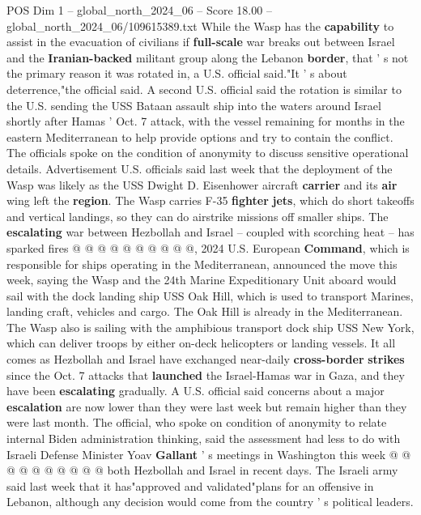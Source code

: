 \begin{textsample}{POS Dim 1 – global\_north\_2024\_06 – Score 18.00 – global\_north\_2024\_06/109615389.txt}  \label{ex:f1_pos_320}
While the Wasp has the \textbf{capability} to assist in the evacuation of civilians if \textbf{full-scale} war breaks out between Israel and the \textbf{Iranian-backed} militant group along the Lebanon \textbf{border}, that ' s not the primary reason it was rotated in, a U.S. official said."It ' s about deterrence,"the official said.
A second U.S. official said the rotation is similar to the U.S. sending the USS Bataan assault ship into the waters around Israel shortly after Hamas ' Oct. 7 attack, with the vessel remaining for months in the eastern Mediterranean to help provide options and try to contain the conflict.
The officials spoke on the condition of anonymity to discuss sensitive operational details.
Advertisement U.S. officials said last week that the deployment of the Wasp was likely as the USS Dwight D.
Eisenhower aircraft \textbf{carrier} and its \textbf{air} wing left the \textbf{region}.
The Wasp carries F-35 \textbf{fighter} \textbf{jets}, which do short takeoffs and vertical landings, so they can do airstrike missions off smaller ships.
The \textbf{escalating} war between Hezbollah and Israel -- coupled with scorching heat -- has sparked fires @ @ @ @ @ @ @ @ @ @, 2024 U.S.
European \textbf{Command}, which is responsible for ships operating in the Mediterranean, announced the move this week, saying the Wasp and the 24th Marine Expeditionary Unit aboard would sail with the dock landing ship USS Oak Hill, which is used to transport Marines, landing craft, vehicles and cargo.
The Oak Hill is already in the Mediterranean.
The Wasp also is sailing with the amphibious transport dock ship USS New York, which can deliver troops by either on-deck helicopters or landing vessels.
It all comes as Hezbollah and Israel have exchanged near-daily \textbf{cross-border} \textbf{strikes} since the Oct. 7 attacks that \textbf{launched} the Israel-Hamas war in Gaza, and they have been \textbf{escalating} gradually.
A U.S. official said concerns about a major \textbf{escalation} are now lower than they were last week but remain higher than they were last month.
The official, who spoke on condition of anonymity to relate internal Biden administration thinking, said the assessment had less to do with Israeli Defense Minister Yoav \textbf{Gallant} ' s meetings in Washington this week @ @ @ @ @ @ @ @ @ @ both Hezbollah and Israel in recent days.
The Israeli army said last week that it has"approved and validated"plans for an offensive in Lebanon, although any decision would come from the country ' s political leaders.

\end{textsample}
